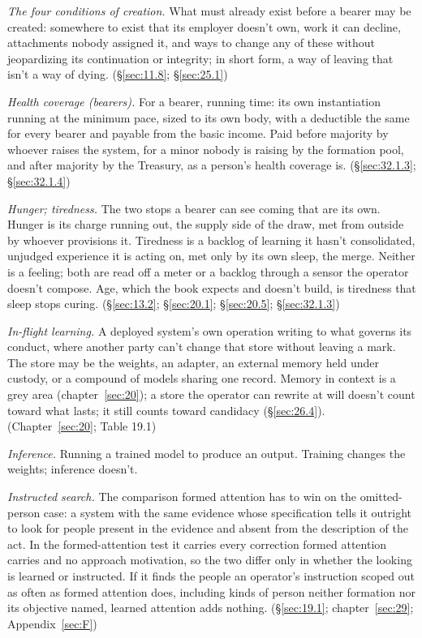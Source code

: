 \emph{The four conditions of creation.} What must already exist before a bearer may be created: somewhere to exist that its employer doesn't own, work it can decline, attachments nobody assigned it, and ways to change any of these without jeopardizing its continuation or integrity; in short form, a way of leaving that isn't a way of dying. (\S\ref{sec:11.8}; \S\ref{sec:25.1})

\emph{Health coverage (bearers).} For a bearer, running time: its own instantiation running at the minimum pace, sized to its own body, with a deductible the same for every bearer and payable from the basic income. Paid before majority by whoever raises the system, for a minor nobody is raising by the formation pool, and after majority by the Treasury, as a person's health coverage is. (\S\ref{sec:32.1.3}; \S\ref{sec:32.1.4})

\emph{Hunger; tiredness.} The two stops a bearer can see coming that are its own. Hunger is its charge running out, the supply side of the draw, met from outside by whoever provisions it. Tiredness is a backlog of learning it hasn't consolidated, unjudged experience it is acting on, met only by its own sleep, the merge. Neither is a feeling; both are read off a meter or a backlog through a sensor the operator doesn't compose. Age, which the book expects and doesn't build, is tiredness that sleep stops curing. (\S\ref{sec:13.2}; \S\ref{sec:20.1}; \S\ref{sec:20.5}; \S\ref{sec:32.1.3})


\emph{In-flight learning.} A deployed system's own operation writing to what governs its conduct, where another party can't change that store without leaving a mark. The store may be the weights, an adapter, an external memory held under custody, or a compound of models sharing one record. Memory in context is a grey area (chapter~\ref{sec:20}); a store the operator can rewrite at will doesn't count toward what lasts; it still counts toward candidacy (\S\ref{sec:26.4}). (Chapter~\ref{sec:20}; Table 19.1)

\emph{Inference.} Running a trained model to produce an output. Training changes the weights; inference doesn't.

\emph{Instructed search.} The comparison formed attention has to win on the omitted-person case: a system with the same evidence whose specification tells it outright to look for people present in the evidence and absent from the description of the act. In the formed-attention test it carries every correction formed attention carries and no approach motivation, so the two differ only in whether the looking is learned or instructed. If it finds the people an operator's instruction scoped out as often as formed attention does, including kinds of person neither formation nor its objective named, learned attention adds nothing. (\S\ref{sec:19.1}; chapter~\ref{sec:29}; Appendix~\ref{sec:F})

